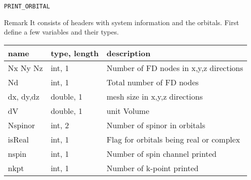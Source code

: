 \begin{frame}[allowframebreaks]{\texttt{PRINT\_ORBITAL}}
\begin{block}{Remark}
It consists of headers with system information and the orbitals. 
First define a few variables and their types. 
\begin{table}[]
\begin{tabular}{|m{1.8cm}|m{2cm}|m{6.3cm}|}
\hline
name         & type, length       & description                                                                                                   \\ \hline
Nx Ny Nz     & int, 1             & Number of FD nodes in x,y,z directions                                                                        \\ \hline
Nd           & int, 1             & Total number of FD nodes                                                                                      \\ \hline
dx, dy,dz    & double, 1         & mesh size in x,y,z directions                                                                                 \\ \hline
dV           & double, 1          & unit Volume                                                                                                   \\ \hline
Nspinor      & int, 2             & Number of spinor in orbitals                                                                                  \\ \hline
isReal       & int, 1             & Flag for orbitals being real or complex                                                                       \\ \hline
nspin        & int, 1             & Number of spin channel printed                                                                                \\ \hline
nkpt         & int, 1             & Number of k-point printed                                                                                     \\ \hline
\end{tabular}
\end{table}
\end{block}


\end{frame}
